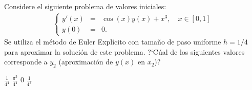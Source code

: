 \begin{pregunta}
\begin{cuerpo}
Considere el siguiente problema de valores iniciales:
\begin{eqnarray*}
\left \{
\begin{array}{lcl}
y'(x)&=& \cos(x)y(x) + x^3, \quad  x \in [0,1]\\
y(0)&=&0.
\end{array}
\right.
\end{eqnarray*}
Se utiliza el m\'etodo de Euler Expl\'icito con tama\~no de paso uniforme $h=1/4$ para aproximar la soluci\'on de este problema. ?`C\'ual de los siguientes valores corresponde a $y_2$ (aproximaci\'on de $y(x)$ en $x_2$)? 
\end{cuerpo}
\begin{multicols}{4}
\begin{alternativas}
{$\displaystyle\frac{1}{4^4}$} %
{{$\displaystyle\frac{\pi^3}{4^4}$}} 
{$0$} 
{$\displaystyle\frac{1}{4^3}$}
\end{alternativas}
\end{multicols}
\justificacion{7cm}
\end{pregunta}
